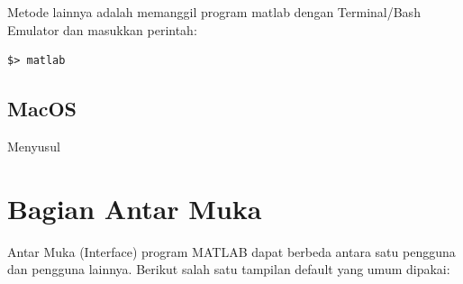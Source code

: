 \documentclass[12pt]{book}
\begin{document}
	\newpage
	Metode lainnya adalah memanggil program matlab dengan Terminal/Bash Emulator dan masukkan perintah:
	\begin{verbatim}
$> matlab
	\end{verbatim}
	
	\subsection{MacOS}
	
	Menyusul
	
	\newpage
	\section{Bagian Antar Muka}
	
	Antar Muka (Interface) program MATLAB dapat berbeda antara satu pengguna dan pengguna lainnya.
	Berikut salah satu tampilan default yang umum dipakai:
	
\end{document}
